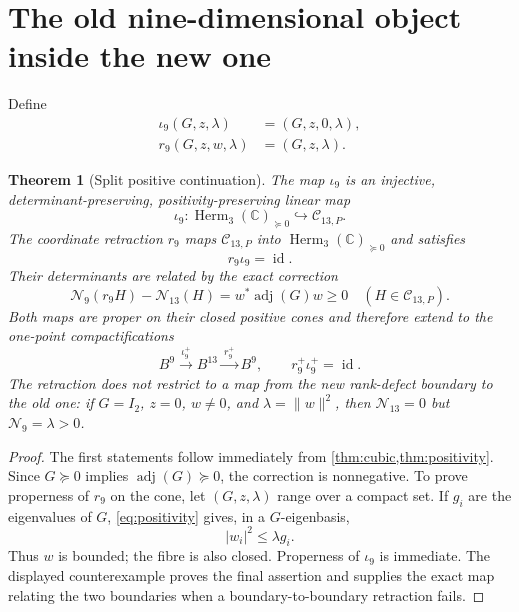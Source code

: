 \documentclass[11pt]{article}
\newtheorem{theorem}{Theorem}[section]
\theoremstyle{definition}
\theoremstyle{remark}
\newcommand{\C}{\mathbb C}
\newcommand{\Herm}{\operatorname{Herm}}
\newcommand{\adj}{\operatorname{adj}}
\newcommand{\id}{\operatorname{id}}
\newcommand{\cC}{\mathcal C}
\newcommand{\cN}{\mathcal N}
\begin{document}
\section{The old nine-dimensional object inside the new one}

Define
\begin{align}
 \iota_9(G,z,\lambda)&=(G,z,0,\lambda),\label{eq:iota9}\\
 r_9(G,z,w,\lambda)&=(G,z,\lambda).\label{eq:r9}
\end{align}

\begin{theorem}[Split positive continuation]\label{thm:split-continuation}
The map $\iota_9$ is an injective, determinant-preserving, positivity-preserving linear map
\begin{equation}\label{eq:iota-cones}
 \iota_9:\Herm_3(\C)_{\succeq0}\hookrightarrow\cC_{13,P}.
\end{equation}
The coordinate retraction $r_9$ maps $\cC_{13,P}$ into $\Herm_3(\C)_{\succeq0}$ and satisfies
\begin{equation}\label{eq:split-r}
 r_9\iota_9=\id.
\end{equation}
Their determinants are related by the exact correction
\begin{equation}\label{eq:det-correction}
 \boxed{
 \cN_9(r_9H)-\cN_{13}(H)
 =w^*\adj(G)w\ge0
 \quad(H\in\cC_{13,P}).}
\end{equation}
Both maps are proper on their closed positive cones and therefore extend to the one-point compactifications
\begin{equation}\label{eq:ball-split}
 B^9\xrightarrow{\ \iota_9^+\ }B^{13}
 \xrightarrow{\ r_9^+\ }B^9,
 \qquad r_9^+\iota_9^+=\id.
\end{equation}
The retraction does not restrict to a map from the new rank-defect boundary to the old one: if $G=I_2$, $z=0$, $w\ne0$, and $\lambda=\|w\|^2$, then $\cN_{13}=0$ but $\cN_9=\lambda>0$.
\end{theorem}

\begin{proof}
The first statements follow immediately from \cref{thm:cubic,thm:positivity}.  Since $G\succeq0$ implies $\adj(G)\succeq0$, the correction is nonnegative.  To prove properness of $r_9$ on the cone, let $(G,z,\lambda)$ range over a compact set.  If $g_i$ are the eigenvalues of $G$, \eqref{eq:positivity} gives, in a $G$-eigenbasis,
\[
 |w_i|^2\le \lambda g_i.
\]
Thus $w$ is bounded; the fibre is also closed.  Properness of $\iota_9$ is immediate.  The displayed counterexample proves the final assertion and supplies the exact map relating the two boundaries when a boundary-to-boundary retraction fails.
\end{proof}
\end{document}
